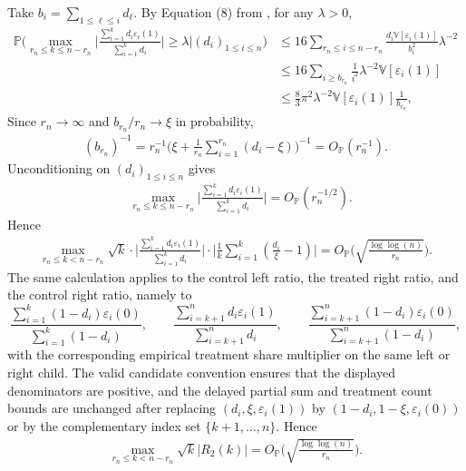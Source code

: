 \documentclass[10pt]{article}
\def\P{\mathbb{P}}
\def\V{\mathbb{V}}
\theoremstyle{definition}
\theoremstyle{remark}
\begin{document}
Take $b_i = \sum_{1 \leq \ell \leq i} d_\ell$. By Equation (8) from \cite{shorack1976inequalities}, for any $\lambda > 0$,
\begin{align*}
    \P \bigg(\max_{r_n \leq k \leq n - r_n} \Big|\frac{\sum_{i = 1}^k d_i \varepsilon_i(1)}{\sum_{i =1}^k d_i}\Big| \geq \lambda \bigg| (d_i)_{1 \leq i \leq n}\bigg) & \leq 16 \sum_{r_n \leq i \leq n - r_n} \frac{d_i\mathbb{V}[\varepsilon_i(1)]}{b_i^2} \lambda^{-2} \\
    & \leq 16 \sum_{i \geq b_{r_n}}\frac{1}{i^2} \lambda^{-2} \V[\varepsilon_i(1)] \\
    & \leq \frac{8}{3}\pi^2 \lambda^{-2} \V[\varepsilon_i(1)] \frac{1}{b_{r_n}},
\end{align*}
Since $r_n\rightarrow\infty$ and $b_{r_n}/r_n\rightarrow \xi$ in probability,
\begin{align*}
    (b_{r_n})^{-1} = r_n^{-1} \Big(\xi + \frac{1}{r_n}\sum_{i = 1}^{r_n}(d_i - \xi)\Big)^{-1} = O_\P(r_n^{-1}).
\end{align*}
Unconditioning on $(d_i)_{1 \leq i \leq n}$ gives
\begin{align}\label{eq: delayed partial sum}
    &\max_{r_n \leq k \leq n - r_n}
    \Bigg|
        \frac{\sum_{i = 1}^k d_i \varepsilon_i(1)}
             {\sum_{i =1}^k d_i}
    \Bigg|
    = O_\P(r_n^{-1/2}).
\end{align}
Hence
\begin{align*}
    \max_{r_n \leq k < n - r_n} \sqrt{k} \cdot \bigg|\frac{\sum_{i = 1}^k d_i \varepsilon_i(1)}{\sum_{i = 1}^k d_i}\bigg| \cdot \bigg|\frac{1}{k}\sum_{i = 1}^k (\frac{d_i}{\xi} - 1) \bigg| = O_{\P} \bigg(\sqrt{\frac{\log \log (n)}{r_n}}\bigg).
\end{align*}
The same calculation applies to the control left ratio, the treated right ratio, and the control right ratio, namely to
\[
\frac{\sum_{i=1}^k(1-d_i)\varepsilon_i(0)}{\sum_{i=1}^k(1-d_i)},\qquad
\frac{\sum_{i=k+1}^n d_i\varepsilon_i(1)}{\sum_{i=k+1}^n d_i},\qquad
\frac{\sum_{i=k+1}^n(1-d_i)\varepsilon_i(0)}{\sum_{i=k+1}^n(1-d_i)},
\]
with the corresponding empirical treatment share multiplier on the same left or right child. The valid candidate convention ensures that the displayed denominators are positive, and the delayed partial sum and treatment count bounds are unchanged after replacing $(d_i,\xi,\varepsilon_i(1))$ by $(1-d_i,1-\xi,\varepsilon_i(0))$ or by the complementary index set $\{k+1,\ldots,n\}$. Hence
\begin{align*}
    \max_{r_n \leq k < n - r_n} \sqrt{k}|R_2(k)| = O_\P \bigg( \sqrt{\frac{\log \log (n)}{r_n}}\bigg).
\end{align*}
\end{document}
